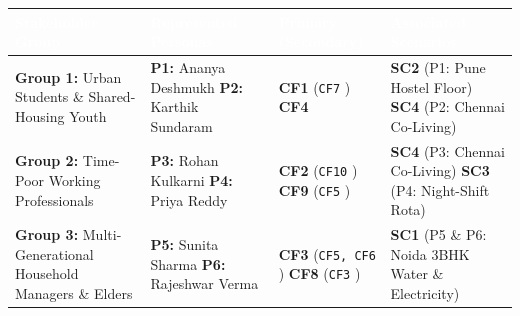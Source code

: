 \documentclass[12pt, a4paper]{article}
\begin{document}
{\footnotesize
{}
\begin{longtable}{|>{\raggedright\arraybackslash}p{4.1cm}|>{\raggedright\arraybackslash}p{4.3cm}|>{\raggedright\arraybackslash}p{2.9cm}|>{\raggedright\arraybackslash}p{4.2cm}|}
\hline
\rowcolor{cNavy}
\textcolor{white}{\textbf{Stakeholder Group}} & \textcolor{white}{\textbf{Represented Personas}} & \textcolor{white}{\textbf{Primary (Secondary)}} & \textcolor{white}{\textbf{Associated Scenarios}} \\
\hline
\textbf{Group 1:} Urban Students \& Shared-Housing Youth & \textbf{P1:} Ananya Deshmukh \newline \textbf{P2:} Karthik Sundaram & \textbf{CF1} \cite{cf1} (\texttt{CF7} \cite{cf7}) \newline \textbf{CF4} \cite{cf4} & \textbf{SC2} (P1: Pune Hostel Floor) \newline \textbf{SC4} (P2: Chennai Co-Living) \\
\hline
\textbf{Group 2:} Time-Poor Working Professionals & \textbf{P3:} Rohan Kulkarni \newline \textbf{P4:} Priya Reddy & \textbf{CF2} \cite{cf2} (\texttt{CF10} \cite{cf10}) \newline \textbf{CF9} \cite{cf9} (\texttt{CF5} \cite{cf5}) & \textbf{SC4} (P3: Chennai Co-Living) \newline \textbf{SC3} (P4: Night-Shift Rota) \\
\hline
\textbf{Group 3:} Multi-Generational Household Managers \& Elders & \textbf{P5:} Sunita Sharma \newline \textbf{P6:} Rajeshwar Verma & \textbf{CF3} \cite{cf3} (\texttt{CF5, CF6} \cite{cf5, cf6}) \newline \textbf{CF8} \cite{cf8} (\texttt{CF3} \cite{cf3}) & \textbf{SC1} (P5 \& P6: Noida 3BHK Water \& Electricity) \\
\hline
\end{longtable}
}
\end{document}
